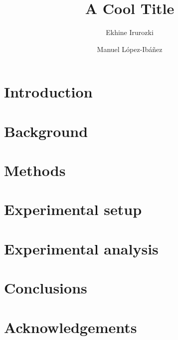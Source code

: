 \documentclass[runningheads]{llncs}
\begin{document}
%
\title{A Cool Title}

\author{Ekhine Irurozki\and
Manuel L{\'o}pez-Ib{\'a}{\~n}ez}

%
\maketitle              %
%
\begin{abstract}


\end{abstract}
%
%
%
\section{Introduction}

\citet{ZaeStoBar2014:ppsn,ZaeStoFriFisNauBar2014}
\citet{PerLopStu2015si}

\citep{LopDubPerStuBir2016irace}

\section{Background}

\section{Methods}

\section{Experimental setup}

\section{Experimental analysis}

\section{Conclusions}

\section*{Acknowledgements}


%
%
%
\renewcommand{\doi}[1]{doi:\hspace{.16667em plus .08333em}\discretionary{}{}{}\href{https://doi.org/#1}{\urlstyle{rm}\nolinkurl{#1}}}


\end{document}
